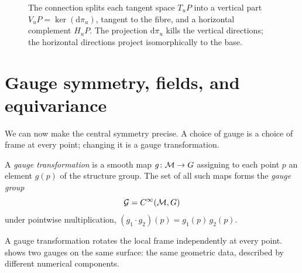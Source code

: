 \begin{figure}[ht]
\caption[Horizontal and vertical decomposition]{The connection splits each
tangent space $T_u P$ into a vertical part $V_u P = \ker(\mathrm{d}\pi_u)$,
tangent to the fibre, and a horizontal complement $H_u P$. The projection
$\mathrm{d}\pi_u$ kills the vertical directions; the horizontal directions
project isomorphically to the base.}
\label{fig:gauge:horizontal-vertical}
\end{figure}

\section{Gauge symmetry, fields, and equivariance}
\label{sec:gauge:symmetry}

We can now make the central symmetry precise. A choice of gauge is a choice of
frame at every point; changing it is a gauge transformation.

\begin{definition}
\label{def:gauge:transformation}
A \emph{gauge transformation} is a smooth map $g\colon \mathcal{M} \to G$ assigning to
each point $p$ an element $g(p)$ of the structure group. The set of all such
maps forms the \emph{gauge group}
\[
  \mathcal{G} = C^\infty(\mathcal{M}, G)
\]
under pointwise multiplication, $(g_1 \cdot g_2)(p) = g_1(p)\, g_2(p)$.
\end{definition}

A gauge transformation rotates the local frame independently at every point.
 shows two gauges on the same surface: the same
geometric data, described by different numerical components.

